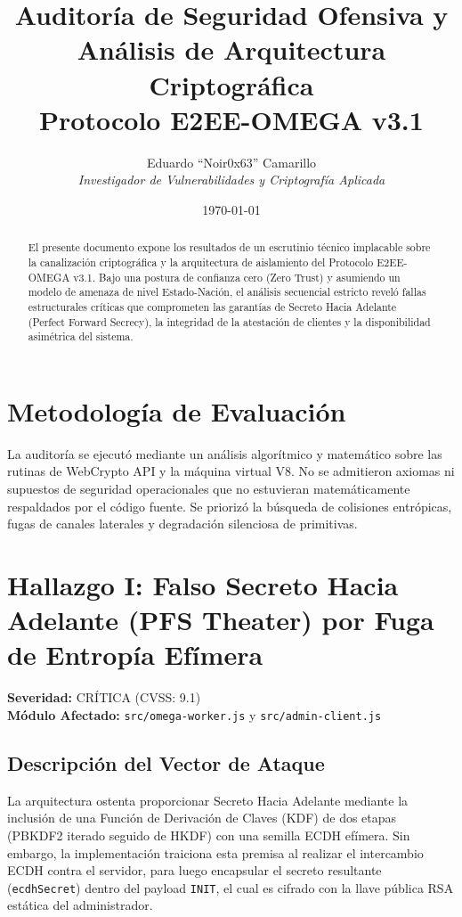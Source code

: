 \documentclass[12pt, a4paper]{article}
\title{\textbf{Auditoría de Seguridad Ofensiva y Análisis de Arquitectura Criptográfica}\\
\large Protocolo E2EE-OMEGA v3.1}
\author{Eduardo ``Noir0x63'' Camarillo\\
\textit{Investigador de Vulnerabilidades y Criptografía Aplicada}}
\date{\today}
\begin{document}
\maketitle

\begin{abstract}
El presente documento expone los resultados de un escrutinio técnico implacable sobre la canalización criptográfica y la arquitectura de aislamiento del Protocolo E2EE-OMEGA v3.1. Bajo una postura de confianza cero (Zero Trust) y asumiendo un modelo de amenaza de nivel Estado-Nación, el análisis secuencial estricto reveló fallas estructurales críticas que comprometen las garantías de Secreto Hacia Adelante (Perfect Forward Secrecy), la integridad de la atestación de clientes y la disponibilidad asimétrica del sistema. 
\end{abstract}

\section{Metodología de Evaluación}
La auditoría se ejecutó mediante un análisis algorítmico y matemático sobre las rutinas de WebCrypto API y la máquina virtual V8. No se admitieron axiomas ni supuestos de seguridad operacionales que no estuvieran matemáticamente respaldados por el código fuente. Se priorizó la búsqueda de colisiones entrópicas, fugas de canales laterales y degradación silenciosa de primitivas.

\section{Hallazgo I: Falso Secreto Hacia Adelante (PFS Theater) por Fuga de Entropía Efímera}
\textbf{Severidad:} CRÍTICA (CVSS: 9.1)\\
\textbf{Módulo Afectado:} \texttt{src/omega-worker.js} y \texttt{src/admin-client.js}

\subsection{Descripción del Vector de Ataque}
La arquitectura ostenta proporcionar Secreto Hacia Adelante mediante la inclusión de una Función de Derivación de Claves (KDF) de dos etapas (PBKDF2 iterado seguido de HKDF) con una semilla ECDH efímera. Sin embargo, la implementación traiciona esta premisa al realizar el intercambio ECDH contra el servidor, para luego encapsular el secreto resultante (\texttt{ecdhSecret}) dentro del payload \texttt{INIT}, el cual es cifrado con la llave pública RSA estática del administrador.
\end{document}
